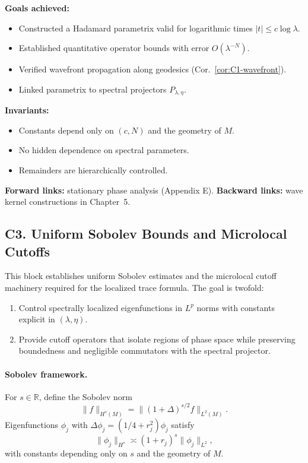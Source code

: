 \begin{auditblock}[C1]
\textbf{Goals achieved:}
\begin{itemize}
  \item Constructed a Hadamard parametrix valid for logarithmic times $|t|\le c\log \lambda$.
  \item Established quantitative operator bounds with error $O(\lambda^{-N})$.
  \item Verified wavefront propagation along geodesics (Cor.~\ref{cor:C1-wavefront}).
  \item Linked parametrix to spectral projectors $P_{\lambda,\eta}$.
\end{itemize}
\textbf{Invariants:}
\begin{itemize}
  \item Constants depend only on $(c,N)$ and the geometry of $M$.
  \item No hidden dependence on spectral parameters.
  \item Remainders are hierarchically controlled.
\end{itemize}
\textbf{Forward links:} stationary phase analysis (Appendix E).  
\textbf{Backward links:} wave kernel constructions in Chapter~5.
\end{auditblock}

\subsection*{C3. Uniform Sobolev Bounds and Microlocal Cutoffs}

\noindent
This block establishes uniform Sobolev estimates and the microlocal cutoff
machinery required for the localized trace formula.  
The goal is twofold:
\begin{enumerate}
  \item Control spectrally localized eigenfunctions in $L^p$ norms with constants
  explicit in $(\lambda,\eta)$.
  \item Provide cutoff operators that isolate regions of phase space while
  preserving boundedness and negligible commutators with the spectral projector.
\end{enumerate}

\paragraph{Sobolev framework.}
For $s\in\mathbb R$, define the Sobolev norm
\[
\|f\|_{H^s(M)} = \|(1+\Delta)^{s/2} f\|_{L^2(M)}.
\]
Eigenfunctions $\phi_j$ with $\Delta \phi_j = (1/4+r_j^2)\phi_j$ satisfy
\[
\|\phi_j\|_{H^s} \asymp (1+r_j)^s \|\phi_j\|_{L^2},
\]
with constants depending only on $s$ and the geometry of $M$.

